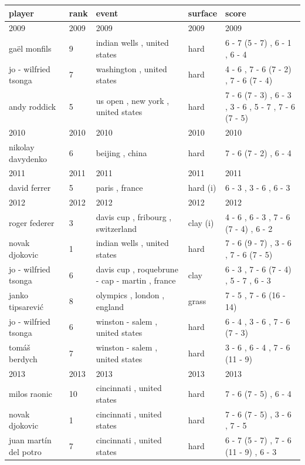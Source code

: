 \documentclass{article}
\begin{document}
\begin{tabular}{lllll}
\toprule
player & rank & event & surface & score \\
\midrule
2009 & 2009 & 2009 & 2009 & 2009 \\
gaël monfils & 9 & indian wells , united states & hard & 6 - 7 (5 - 7) , 6 - 1 , 6 - 4 \\
jo - wilfried tsonga & 7 & washington , united states & hard & 4 - 6 , 7 - 6 (7 - 2) , 7 - 6 (7 - 4) \\
andy roddick & 5 & us open , new york , united states & hard & 7 - 6 (7 - 3) , 6 - 3 , 3 - 6 , 5 - 7 , 7 - 6 (7 - 5) \\
2010 & 2010 & 2010 & 2010 & 2010 \\
nikolay davydenko & 6 & beijing , china & hard & 7 - 6 (7 - 2) , 6 - 4 \\
2011 & 2011 & 2011 & 2011 & 2011 \\
david ferrer & 5 & paris , france & hard (i) & 6 - 3 , 3 - 6 , 6 - 3 \\
2012 & 2012 & 2012 & 2012 & 2012 \\
roger federer & 3 & davis cup , fribourg , switzerland & clay (i) & 4 - 6 , 6 - 3 , 7 - 6 (7 - 4) , 6 - 2 \\
novak djokovic & 1 & indian wells , united states & hard & 7 - 6 (9 - 7) , 3 - 6 , 7 - 6 (7 - 5) \\
jo - wilfried tsonga & 6 & davis cup , roquebrune - cap - martin , france & clay & 6 - 3 , 7 - 6 (7 - 4) , 5 - 7 , 6 - 3 \\
janko tipsarević & 8 & olympics , london , england & grass & 7 - 5 , 7 - 6 (16 - 14) \\
jo - wilfried tsonga & 6 & winston - salem , united states & hard & 6 - 4 , 3 - 6 , 7 - 6 (7 - 3) \\
tomáš berdych & 7 & winston - salem , united states & hard & 3 - 6 , 6 - 4 , 7 - 6 (11 - 9) \\
2013 & 2013 & 2013 & 2013 & 2013 \\
milos raonic & 10 & cincinnati , united states & hard & 7 - 6 (7 - 5) , 6 - 4 \\
novak djokovic & 1 & cincinnati , united states & hard & 7 - 6 (7 - 5) , 3 - 6 , 7 - 5 \\
juan martín del potro & 7 & cincinnati , united states & hard & 6 - 7 (5 - 7) , 7 - 6 (11 - 9) , 6 - 3 \\
\bottomrule
\end{tabular}
\end{document}
